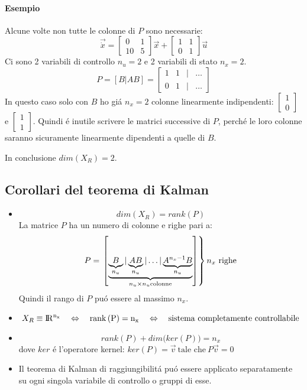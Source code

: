 \documentclass[../main.tex]{subfiles}
\begin{document}
		\begin{mdframed}[style=Esempio]
			\paragraph{Esempio}
			Alcune volte non tutte le colonne di $ P $ sono necessarie:
			\[
				\vec{\dot x} =
				\begin{bmatrix}
					0 & 1\\
					10 & 5
				\end{bmatrix} \vec x +
				\begin{bmatrix}
					1 & 1\\
					0 & 1
				\end{bmatrix} \vec u
			\]
			Ci sono 2 variabili di controllo $ n_u = 2 $ e 2 variabili di stato $ n_x = 2 $.
			\[
				P = \left[ B | AB \right] =
				\begin{bmatrix}
					1 & 1 & | & \dots\\
					0 & 1 & | & \dots
				\end{bmatrix}
			 \]
			 In questo caso solo con $ B $ ho gi\'a $ n_x = 2 $ colonne linearmente indipendenti: $ \begin{bmatrix} 1\\ 0 \end{bmatrix} $ e $ \begin{bmatrix} 1\\ 1 \end{bmatrix} $. Quindi \'e inutile scrivere le matrici successive di $ P $, perch\'e le loro colonne saranno sicuramente linearmente dipendenti a quelle di $ B $.
			 
			 In conclusione $ dim\left( X_R \right) = 2 $.
		\end{mdframed}

	\subsection{Corollari del teorema di Kalman}
		\begin{itemize}
			\item 
				\[ 
					dim\left( X_R \right) = rank\left( P \right) 
				\]
				La matrice $ P $ ha un numero di colonne e righe pari a:
				\[ 
					P = \left. \left[ \underbrace{\underbrace{B}_{n_u} | \underbrace{AB}_{n_u} | \dots | \underbrace{A^{n_x-1} B}_{n_u}}_{n_u \times n_u \text{colonne}} \right] \right\rbrace\text{$ n_x $ righe}
				\]
				Quindi il rango di $ P $ pu\'o essere al massimo $ n_x $.
			\item 
				\[ 
					X_R \equiv \rm I\!R^{n_x} \quad\Leftrightarrow\quad rank\left( P \right) = n_x \quad\Leftrightarrow\quad \text{sistema completamente controllabile}
				\]
			\item 
				\[ 
					rank\left( P \right) + dim \big( ker\left( P \right) \big) = n_x
				\]
				dove $ ker $ \'e l'operatore kernel: $ ker\left( P \right) = \vec v\ \text{tale che}\ P \vec v = 0 $
			\item 
				Il teorema di Kalman di raggiungibilit\'a pu\'o essere applicato separatamente su ogni singola variabile di controllo o gruppi di esse.
		\end{itemize}
	
\end{document}
